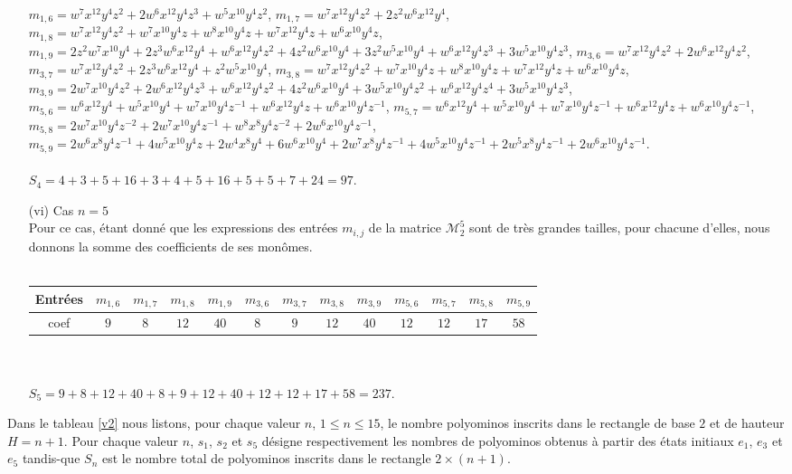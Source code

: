 \begin{itemize}
$m_{1,6}=w^7x^{12}y^4z^{2}+2w^6x^{12}y^4z^{3}+w^5x^{10}y^4z^{2}$, $m_{1,7}=w^7x^{12}y^4z^{2}+2z^2w^6x^{12}y^4$, $m_{1,8}=w^7x^{12}y^4z^2+w^7x^{10}y^4z+w^8x^{10}y^4z+w^7x^{12}y^4z+w^6x^{10}y^4z$, $m_{1,9}=2z^2w^7x^{10}y^4+2z^3w^6x^{12}y^4+w^6x^{12}y^4z^{2}+4z^2w^6x^{10}y^4+3z^2w^5x^{10}y^4+w^6x^{12}y^4z^{3}+3w^5x^{10}y^4z^{3}$,  $m_{3,6}=w^7x^{12}y^4z^{2}+2w^6x^{12}y^4z^{2}$, $m_{3,7}=w^7x^{12}y^4z^{2}+2z^3w^6x^{12}y^4+z^2w^5x^{10}y^4$, $m_{3,8}=w^7x^{12}y^4z^{2}+w^7x^{10}y^4z+w^8x^{10}y^4z+w^7x^{12}y^4z+w^6x^{10}y^4z$, $m_{3,9}=2w^7x^{10}y^4z^{2}+2w^6x^{12}y^4z^{3}+w^6x^{12}y^4z^{2}+4z^2w^6x^{10}y^4+3w^5x^{10}y^4z^{2}+w^6x^{12}y^4z^{4}+3w^5x^{10}y^4z^{3}$, $m_{5,6}=w^6x^{12}y^4+w^5x^{10}y^4+w^7x^{10}y^4z^{-1}+w^6x^{12}y^4z+w^6x^{10}y^4z^{-1}$, $m_{5,7}=w^6x^{12}y^4+w^5x^{10}y^4+w^7x^{10}y^4z^{-1}+w^6x^{12}y^4z+w^6x^{10}y^4z^{-1}$,  $m_{5,8}=
2w^7x^{10}y^4z^{-2}+2w^7x^{10}y^4z^{-1}+w^8x^8y^4z^{-2}+2w^6x^{10}y^4z^{-1}$, $m_{5,9}= 2w^6x^8y^4z^{-1}+4w^5x^{10}y^4z+2w^4x^8y^4+6w^6x^{10}y^4+2w^7x^8y^4z^{-1}+4w^5x^{10}y^4z^{-1}+2w^5x^8y^4z^{-1}+2w^6x^{10}y^4z^{-1}$.
\mbox{ }\\\\
$S_{4}=4+3+5+16+3+4+5+16+5+5+7+24=97$.
\item[(vi)] Cas $n=5$\\

Pour ce cas, étant donné que les expressions des entrées $m_{i,j}$ de la matrice $\mathcal{M}_{2}^{5}$ sont de très grandes tailles, pour chacune d'elles, nous donnons la somme des coefficients  de ses monômes.\\\\
 \tiny
\begin{tabular}{|c|c|c|c|c|c|c|c|c|c|c|c|c|}
 \hline
Entrées & $m_{1,6}$& $m_{1,7}$&$m_{1,8}$ & $m_{1,9}$& $m_{3,6}$ &$m_{3,7}$ & $m_{3,8}$&$m_{3,9}$ & $m_{5,6}$& $m_{5,7}$ &$m_{5,8}$ &$m_{5,9}$ \\
 \hline
 coef  &$9$ &$8$&$12$ &$40$  &$8$ &$9$ &$12$  &$40$&$12$ &$12$  &$17$&$58$ \\
 \hline
 \end{tabular}
 \normalsize
\mbox{ }\\\\
$S_{5}=9+8+12+40+8+9+12+40+12+12+17+58=237$.
\end{itemize}
Dans le tableau \ref{v2} nous listons, pour chaque valeur $n$, $1\leq n\leq 15$, le nombre  polyominos inscrits dans le rectangle de base $2$ et de hauteur $H=n+1$. Pour chaque valeur $n$, $s_{1}$, $s_{2}$ et $s_{5}$ désigne respectivement les nombres de polyominos obtenus à partir des états initiaux $e_{1}$, $e_{3}$ et $e_{5}$ tandis-que $S_{n}$ est le nombre total de polyominos inscrits dans le rectangle $2\times (n+1)$.
